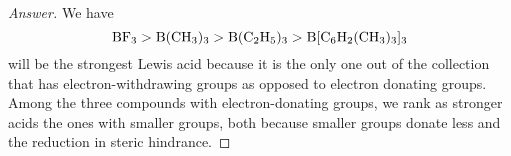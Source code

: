 \documentclass[../psets.tex]{subfiles}
\begin{document}
\begin{enumerate}[label={\Roman*)}]
\begin{enumerate}[label={\textbf{6.\arabic*}}]
\begin{proof}[Answer]
            We have
            \begin{equation*}
                \ce{BF3} > \ce{B(CH3)3} > \ce{B(C2H5)3} > \ce{B[C6H2(CH3)3]3}
            \end{equation*}
             will be the strongest Lewis acid because it is the only one out of the collection that has electron-withdrawing groups as opposed to electron donating groups. Among the three compounds with electron-donating groups, we rank as stronger acids the ones with smaller groups, both because smaller groups donate less and the reduction in steric hindrance.
        \end{proof}
    \end{enumerate}
\end{enumerate}
\end{document}
